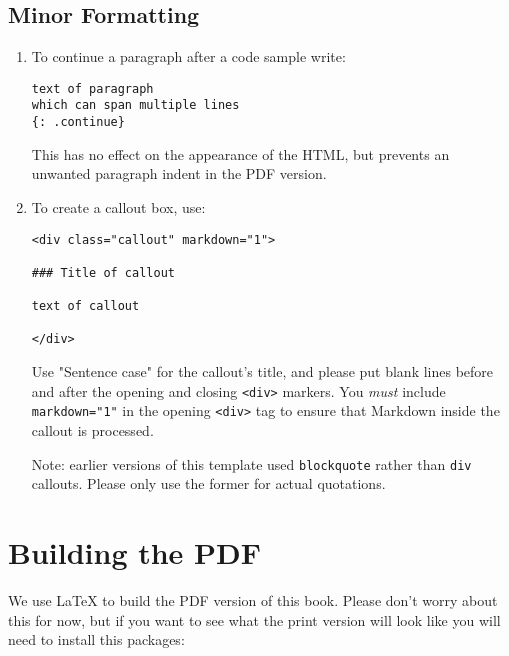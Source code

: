 \documentclass[krantzl]{krantz}
\begin{document}
\subsection*{Minor Formatting}

\begin{enumerate}

\item 

To continue a paragraph after a code sample write:

\begin{lstlisting}[frame=single,frameround=tttt]
text of paragraph
which can span multiple lines
{: .continue}
\end{lstlisting}


This has no effect on the appearance of the HTML,
but prevents an unwanted paragraph indent in the PDF version.



\item 

To create a callout box, use:

\begin{lstlisting}[frame=single,frameround=tttt]
<div class="callout" markdown="1">

### Title of callout

text of callout

</div>
\end{lstlisting}


Use "Sentence case" for the callout's title,
and please put blank lines before and after the opening and closing \texttt{<div>} markers.
You \emph{must} include \texttt{markdown="1"} in the opening \texttt{<div>} tag
to ensure that Markdown inside the callout is processed.


Note: earlier versions of this template used \texttt{blockquote} rather than \texttt{div} callouts.
Please only use the former for actual quotations.



\end{enumerate}

\section*{Building the PDF}


We use LaTeX to build the PDF version of this book.
Please don't worry about this for now,
but if you want to see what the print version will look like
you will need to install this packages:
\end{document}

